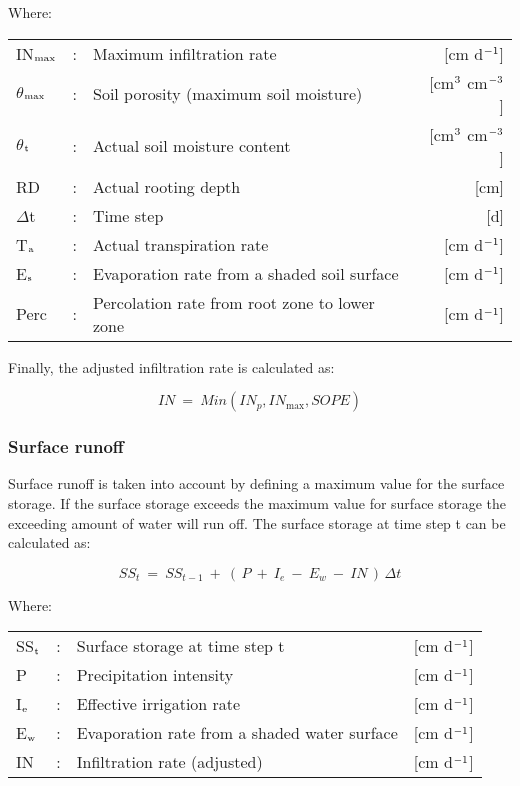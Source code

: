 Where:\\[5pt]
\begin{tabularx}{\textwidth}{llXr}
	IN$_{{\rm max}}$ &:& Maximum infiltration rate  & [cm d$^{{\rm -1}}$]\\
	$\theta$$_{{\rm max}}$ &:& Soil porosity (maximum soil moisture)  
	& [cm$^{{\rm 3}}$ cm$^{{\rm -3}}$]\\
	$\theta$$_{{\rm t}}$ &:& Actual soil moisture content  
	& [cm$^{{\rm 3}}$ cm$^{{\rm -3}}$]\\
	RD &:& Actual rooting depth  & [cm]\\
	$\Delta$t &:& Time step  & [d]\\
	T$_{{\rm a}}$ &:& Actual transpiration rate   & [cm d$^{{\rm -1}}$]\\
	E$_{{\rm s}}$ &:& Evaporation rate from a shaded soil surface  & [cm d$^{{\rm -1}}$]\\
	Perc &:& Percolation rate from root zone to lower zone  & [cm d$^{{\rm -1}}$]\\
\end{tabularx}

Finally, the adjusted infiltration rate is calculated as:

\begin{equation}
\label{eq:INact}
IN ~=~ Min(IN_{p}, IN_{\max}, SOPE)
\end{equation}


\subsubsection{Surface runoff}

Surface runoff is taken into account by defining a maximum value for the surface storage. If the surface storage exceeds the maximum value for surface storage the exceeding amount of water will run off. The surface storage at time step t can be calculated as:

\begin{equation}
\label{eq:6.29}
SS_{t} ~=~ SS _{t-1} ~+~ (\, P ~+~ I _{e} ~-~ E _{w} ~-~ IN\, )\, \Delta t
\end{equation}

Where:\\[5pt]
\begin{tabularx}{\textwidth}{llXr}
	SS$_{{\rm t}}$ &:& Surface storage at time step t  & [cm d$^{{\rm -1}}$]\\
	P &:& Precipitation intensity  & [cm d$^{{\rm -1}}$]\\
	I$_{{\rm e}}$ &:& Effective irrigation rate  & [cm d$^{{\rm -1}}$]\\
	E$_{{\rm w}}$ &:& Evaporation rate from a shaded water surface  & [cm d$^{{\rm -1}}$]\\
	IN &:& Infiltration rate (adjusted)  & [cm d$^{{\rm -1}}$]\\
\end{tabularx}

